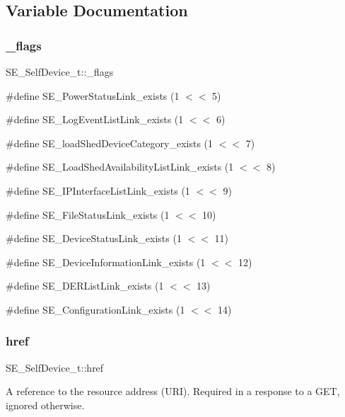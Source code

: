 \subsection{Variable Documentation}
\mbox{\label{group__SelfDevice_ga27f85d9e504787c2216b4e4b563acd5a}} 
\subsubsection{\texorpdfstring{\+\_\+flags}{\_flags}}
{\footnotesize\ttfamily S\+E\+\_\+\+Self\+Device\+\_\+t\+::\+\_\+flags}

\#define S\+E\+\_\+\+Power\+Status\+Link\+\_\+exists (1 $<$$<$ 5)

\#define S\+E\+\_\+\+Log\+Event\+List\+Link\+\_\+exists (1 $<$$<$ 6)

\#define S\+E\+\_\+load\+Shed\+Device\+Category\+\_\+exists (1 $<$$<$ 7)

\#define S\+E\+\_\+\+Load\+Shed\+Availability\+List\+Link\+\_\+exists (1 $<$$<$ 8)

\#define S\+E\+\_\+\+I\+P\+Interface\+List\+Link\+\_\+exists (1 $<$$<$ 9)

\#define S\+E\+\_\+\+File\+Status\+Link\+\_\+exists (1 $<$$<$ 10)

\#define S\+E\+\_\+\+Device\+Status\+Link\+\_\+exists (1 $<$$<$ 11)

\#define S\+E\+\_\+\+Device\+Information\+Link\+\_\+exists (1 $<$$<$ 12)

\#define S\+E\+\_\+\+D\+E\+R\+List\+Link\+\_\+exists (1 $<$$<$ 13)

\#define S\+E\+\_\+\+Configuration\+Link\+\_\+exists (1 $<$$<$ 14) \mbox{\label{group__SelfDevice_ga2aea57d2afcdf455280b2f24ea8ccdd4}} 
\subsubsection{\texorpdfstring{href}{href}}
{\footnotesize\ttfamily S\+E\+\_\+\+Self\+Device\+\_\+t\+::href}

A reference to the resource address (U\+RI). Required in a response to a G\+ET, ignored otherwise. \mbox{\label{group__SelfDevice_gadbf029568d8491054c76882da4576499}} 

